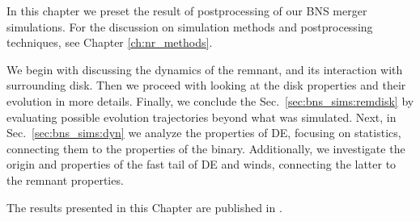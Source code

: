 In this chapter we preset the result of postprocessing of our 
\ac{BNS} merger simulations. 
For the discussion on simulation methods and postprocessing techniques, 
see Chapter \ref{ch:nr_methods}. 

We begin with discussing the dynamics of the \pmerg{} remnant, and 
its interaction with surrounding disk. Then we proceed with looking 
at the disk properties and their evolution in more details. Finally, we 
conclude the Sec.~\ref{sec:bns_sims:remdisk} by evaluating possible evolution 
trajectories beyond what was simulated. 
%
Next, in Sec.~\ref{sec:bns_sims:dyn} we analyze the properties of 
\ac{DE}, focusing on statistics, connecting them to the properties of the binary. 
Additionally, we investigate the origin and properties of the fast tail of 
\ac{DE} and \pmerg{} winds, connecting the latter to the remnant properties. 

The results presented in this Chapter are published in 
\citet{Nedora:2019jhl,Nedora:2020pak,Nedora:2020qtd,Nedora:2021eoj,Bernuzzi:2020txg}.






